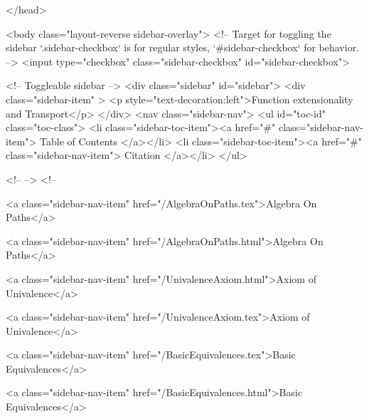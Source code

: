   
</head>




  <body class="layout-reverse sidebar-overlay">
    <!-- Target for toggling the sidebar `.sidebar-checkbox` is for regular
     styles, `#sidebar-checkbox` for behavior. -->
<input type="checkbox" class="sidebar-checkbox" id="sidebar-checkbox">

<!-- Toggleable sidebar -->
<div class="sidebar" id="sidebar">
  <div class="sidebar-item" >
    <p style="text-decoration:left">Function extensionality and Transport</p>
  </div>
  <nav class="sidebar-nav">
    <ul id="toc-id" class="toc-class">
  <li class="sidebar-toc-item"><a href="#" class="sidebar-nav-item"> Table of Contents </a></li>
  <li class="sidebar-toc-item"><a href="#" class="sidebar-nav-item"> Citation </a></li>
</ul>


    <!--  -->
    <!-- 
      
    
      
    
      
    
      
    
      
        
      
    
      
        
          <a class="sidebar-nav-item" href="/AlgebraOnPaths.tex">Algebra On Paths</a>
        
      
    
      
        
          <a class="sidebar-nav-item" href="/AlgebraOnPaths.html">Algebra On Paths</a>
        
      
    
      
        
          <a class="sidebar-nav-item" href="/UnivalenceAxiom.html">Axiom of Univalence</a>
        
      
    
      
        
          <a class="sidebar-nav-item" href="/UnivalenceAxiom.tex">Axiom of Univalence</a>
        
      
    
      
        
          <a class="sidebar-nav-item" href="/BasicEquivalences.tex">Basic Equivalences</a>
        
      
    
      
        
          <a class="sidebar-nav-item" href="/BasicEquivalences.html">Basic Equivalences</a>
        
